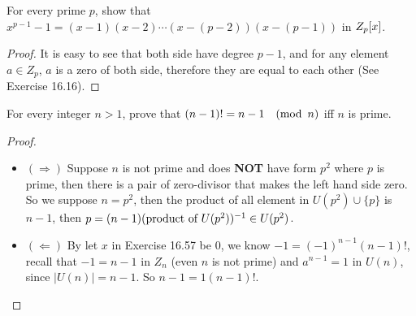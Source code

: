 \documentclass[../main.tex]{subfiles}
\begin{document}
\setcounter{exercise}{56}
\begin{exercise}
  For every prime $p$, show that $x^{p - 1} - 1 = (x - 1)(x - 2)\cdots(x - (p - 2))(x - (p - 1))$
  in $Z_p[x]$.
\end{exercise}
\begin{proof}
  It is easy to see that both side have degree $p - 1$,
  and for any element $a \in Z_p$, $a$ is a zero of both side, therefore they are equal
  to each other (See Exercise 16.16).
\end{proof}

\begin{exercise}
  For every integer $n > 1$, prove that $(n - 1)! = n - 1 \quad (\modu \ n)$
  iff $n$ is prime.
\end{exercise}
\begin{proof}
  ~
  \begin{itemize}
    \item $(\Rightarrow)$
      Suppose $n$ is not prime and does \textbf{NOT} have form $p^2$ where $p$ is prime,
      then there is a pair of zero-divisor that makes the left hand side zero.
      So we suppose $n = p^2$,
      then the product of all element in $U(p^2) \cup \{ p \}$ is $n - 1$,
      then $p = (n - 1)(\text{product of $U(p^2)$})^{-1} \in U(p^2)$.
    \item $(\Leftarrow)$
      By let $x$ in Exercise 16.57 be $0$, we know $-1 = (-1)^{n - 1} (n - 1)!$,
      recall that $-1 = n - 1$ in $Z_n$ (even $n$ is not prime)
      and $a^{n - 1} = 1$ in $U(n)$, since $|U(n)| = n - 1$.
      So $n - 1 = 1 (n - 1)!$.
  \end{itemize}
\end{proof}
\end{document}
